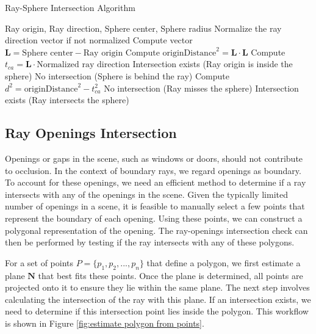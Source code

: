 \documentclass[11pt, a4paper,oneside,chapterprefix=false]{scrbook}
\begin{document}
\begin{algorithm}[H]
\caption{Ray-Sphere Intersection Algorithm}
\begin{algorithmic}[1]
\Require Ray origin, Ray direction, Sphere center, Sphere radius
\State Normalize the ray direction vector if not normalized
\State Compute vector \( \mathbf{L} = \text{Sphere center} - \text{Ray origin} \)
\State Compute \( \text{originDistance}^2 = \mathbf{L} \cdot \mathbf{L} \)
\State Compute \( t_{ca} = \mathbf{L} \cdot \text{Normalized ray direction} \)
    \State \Return Intersection exists (Ray origin is inside the sphere)
\EndIf
{}
    \State \Return No intersection (Sphere is behind the ray)
\EndIf
\State Compute \( d^2 = \text{originDistance}^2 - t_{ca}^2 \)
    \State \Return No intersection (Ray misses the sphere)
\Else
    \State \Return Intersection exists (Ray intersects the sphere)
\EndIf
\end{algorithmic}
\end{algorithm}


\subsection{Ray Openings Intersection}

Openings or gaps in the scene, such as windows or doors, should not contribute to occlusion. In the context of boundary rays, we regard openings as boundary. To account for these openings, we need an efficient method to determine if a ray intersects with any of the openings in the scene. Given the typically limited number of openings in a scene, it is feasible to manually select a few points that represent the boundary of each opening. Using these points, we can construct a polygonal representation of the opening. The ray-openings intersection check can then be performed by testing if the ray intersects with any of these polygons.

\vspace{10pt}

For a set of points \( P = \{p_1, p_2, ..., p_n\} \) that define a polygon, we first estimate a plane \( \mathbf{N} \) that best fits these points. Once the plane is determined, all points are projected onto it to ensure they lie within the same plane. The next step involves calculating the intersection of the ray with this plane. If an intersection exists, we need to determine if this intersection point lies inside the polygon. This workflow is shown in Figure \ref{fig:estimate polygon from points}.
\end{document}
